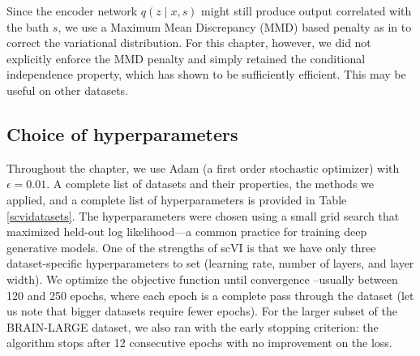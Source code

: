 Since the encoder network $q(z \mid x, s)$ might still produce output correlated with the bath $s$, we use a Maximum Mean Discrepancy (MMD) based penalty as in \cite{louizos2016variational} to correct the variational distribution. For this chapter, however, we did not explicitly enforce the MMD penalty and simply retained the conditional independence property, which has shown to be sufficiently efficient. This may be useful on other datasets.

\subsection{Choice of hyperparameters}
Throughout the chapter, we use Adam (a first order stochastic optimizer) with $\epsilon = 0.01$. A complete list of datasets and their properties, the methods we applied, and a complete list of hyperparameters is provided in Table \ref{scvidatasets}. The hyperparameters were chosen using a small grid search that maximized held-out log likelihood---a common practice for training deep generative models. One of the strengths of scVI is that we have only three dataset-specific hyperparameters to set (learning rate, number of layers, and layer width). We optimize the objective function until convergence  --usually between 120 and 250 epochs, where each epoch is a complete pass through the dataset (let us note that bigger datasets require fewer epochs). For the larger subset of the BRAIN-LARGE dataset, we also ran with the early stopping criterion: the algorithm stops after 12 consecutive epochs with no improvement on the loss. 


